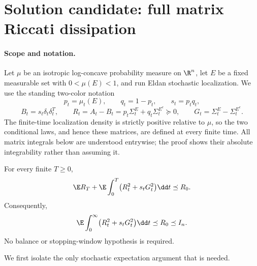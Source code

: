 \documentclass[../main.tex]{subfiles}
\begin{document}
%
\section*{Solution candidate: full matrix Riccati dissipation}
\label{sec:sol-full-matrix-dissipation}

\paragraph{Scope and notation.}
Let $\mu$ be an isotropic log-concave probability measure on $\R^n$, let $E$ be a fixed
measurable set with $0<\mu(E)<1$, and run Eldan stochastic localization.  We use the standing
two-color notation
\[
 p_t=\mu_t(E),\qquad q_t=1-p_t,\qquad s_t=p_tq_t,
\]
\[
 B_t=s_t\delta_t\delta_t^T,
 \qquad
 R_t=A_t-B_t=p_t\Sigma_t^E+q_t\Sigma_t^{E^c}\succeq0,
 \qquad
 G_t=\Sigma_t^E-\Sigma_t^{E^c}.
\]
The finite-time localization density is strictly positive relative to $\mu$, so the two
conditional laws, and hence these matrices, are defined at every finite time.  All matrix
integrals below are understood entrywise; the proof shows their absolute integrability rather
than assuming it.

\begin{theorem}
\label{thm:sol-full-matrix-dissipation}
For every finite $T\geq0$,
\begin{equation}
 \E R_T+
 \E\int_0^T\bigl(R_t^2+s_tG_t^2\bigr)\dd t
 \preceq R_0.
 \label{eq:sol-full-matrix-finite}
\end{equation}
Consequently,
\begin{equation}
 \E\int_0^\infty\bigl(R_t^2+s_tG_t^2\bigr)\dd t
 \preceq R_0\preceq I_n.
 \label{eq:sol-full-matrix-infinite}
\end{equation}
No balance or stopping-window hypothesis is required.
\end{theorem}

We first isolate the only stochastic expectation argument that is needed.
\end{document}
